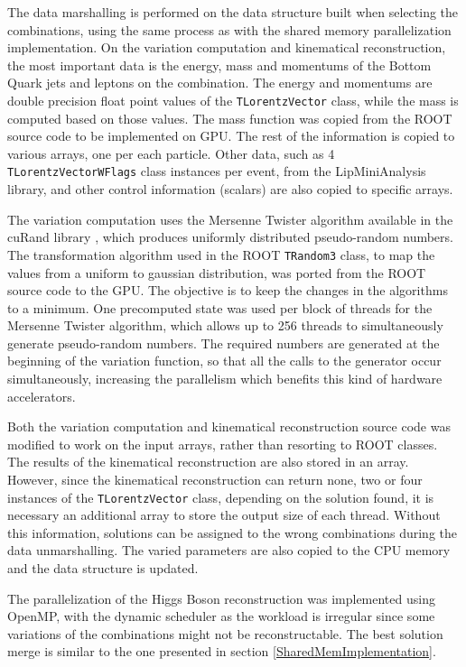 The data marshalling is performed on the data structure built when selecting the combinations, using the same process as with the shared memory parallelization implementation. On the variation computation and kinematical reconstruction, the most important data is the energy, mass and momentums of the Bottom Quark jets and leptons on the combination. The energy and momentums are double precision float point values of the \texttt{TLorentzVector} class, while the mass is computed based on those values. The mass function was copied from the ROOT source code to be implemented on GPU. The rest of the information is copied to various arrays, one per each particle. Other data, such as 4 \texttt{TLorentzVectorWFlags} class instances per event, from the LipMiniAnalysis library, and other control information (scalars) are also copied to specific arrays.

The variation computation uses the Mersenne Twister algorithm available in the \nvidia cuRand library \cite{NVIDIA:cuRand}, which produces uniformly distributed pseudo-random numbers. The transformation algorithm used in the ROOT \texttt{TRandom3} class, to map the values from a uniform to gaussian distribution, was ported from the ROOT source code to the GPU. The objective is to keep the changes in the \ttDilepKinFit algorithms to a minimum. One precomputed state was used per block of threads for the Mersenne Twister algorithm, which allows up to 256 threads to simultaneously generate pseudo-random numbers. The required numbers are generated at the beginning of the variation function, so that all the calls to the generator occur simultaneously, increasing the parallelism which benefits this kind of hardware accelerators.

Both the variation computation and kinematical reconstruction source code was modified to work on the input arrays, rather than resorting to ROOT classes. The results of the kinematical reconstruction are also stored in an array. However, since the kinematical reconstruction can return none, two or four instances of the \texttt{TLorentzVector} class, depending on the solution found, it is necessary an additional array to store the output size of each thread. Without this information, solutions can be assigned to the wrong combinations during the data unmarshalling. The varied parameters are also copied to the CPU memory and the data structure is updated.

The parallelization of the Higgs Boson reconstruction was implemented using OpenMP, with the dynamic scheduler as the workload is irregular since some variations of the combinations might not be reconstructable. The best solution merge is similar to the one presented in section \ref{SharedMemImplementation}.

